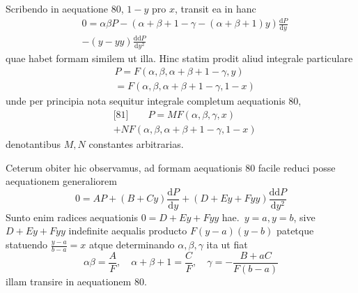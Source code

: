 Scribendo in aequatione 80, \(1-y\) pro \(x\), transit ea in hanc
\[
\begin{aligned}&0=\alpha\beta P-(\alpha+\beta+1-\gamma-(\alpha+\beta+1)y)
\frac{\mathrm{d}P}{\mathrm{d}y}\\&-(y-yy)\frac{\mathrm{dd}P}{\mathrm{d}y^2}\end{aligned}
\]
quae habet formam similem ut illa. Hinc statim prodit aliud integrale particulare
\[
\begin{aligned}&P=F(\alpha,\beta,\alpha+\beta+1-\gamma,y)\\&=F(\alpha,\beta,\alpha+\beta+1-\gamma,1-x)\end{aligned}
\]
unde per principia nota sequitur integrale completum aequationis 80,
\[
\begin{aligned}&\text{[81]}\qquad
P=MF(\alpha,\beta,\gamma,x)\\&+NF(\alpha,\beta,\alpha+\beta+1-\gamma,1-x)\end{aligned}
\]
denotantibus \(M,N\) constantes arbitrarias.

Ceterum obiter hic observamus, ad formam aequationis 80 facile reduci
posse aequationem generaliorem
\[
0=AP+(B+Cy)\frac{\mathrm{d}P}{\mathrm{d}y}
+(D+Ey+Fyy)\frac{\mathrm{dd}P}{\mathrm{d}y^2}
\]
Sunto enim radices aequationis \(0=D+Ey+Fyy\) hae.\ \(y=a,y=b\),
sive \(D+Ey+Fyy\) indefinite aequalis producto \(F(y-a)(y-b)\)
patetque statuendo \(\frac{y-a}{b-a}=x\) atque determinando
\(\alpha,\beta,\gamma\) ita ut fiat
\[
\alpha\beta=\frac{A}{F},\quad
\alpha+\beta+1=\frac{C}{F},\quad
\gamma=-\frac{B+aC}{F(b-a)}
\]
illam transire in aequationem 80.

